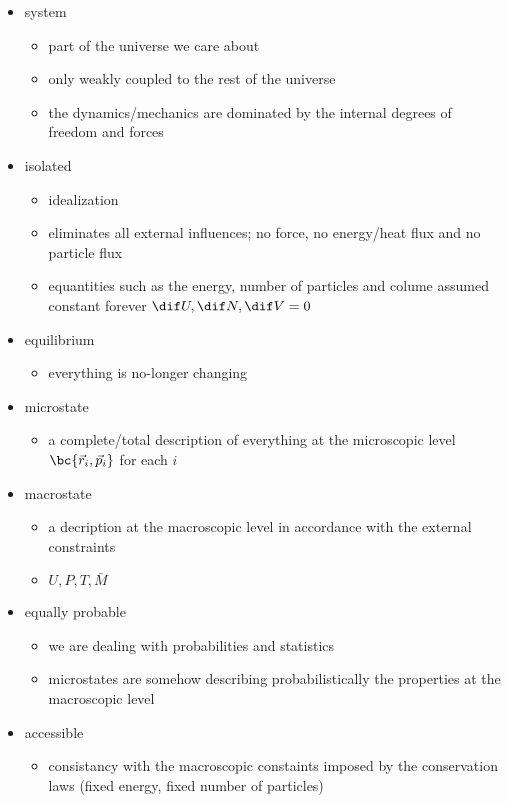\documentclass{article}
\begin{document}
\begin{itemize}
    \item system
    \begin{itemize}
        \item part of the universe we care about
        \item only weakly coupled to the rest of the universe
        \item the dynamics/mechanics are dominated by the internal degrees of freedom and forces
    \end{itemize}
    \item isolated
    \begin{itemize}
        \item idealization
        \item eliminates all external influences; no force, no energy/heat flux and no particle flux
        \item equantities such as the energy, number of particles and colume assumed constant forever $\dif U, \dif N, \dif V = 0$
    \end{itemize}
    \item equilibrium
    \begin{itemize}
        \item everything is no-longer changing
    \end{itemize}
    \item microstate
    \begin{itemize}
        \item a complete/total description of everything at the microscopic level $\bc{\vec{r}_i, \vec{p}_i}$ for each $i$
    \end{itemize}
    \item macrostate
    \begin{itemize}
        \item a decription at the macroscopic level in accordance with the external constraints
        \item $U, P, T, \bar{M}$
    \end{itemize}
    \item equally probable
    \begin{itemize}
        \item we are dealing with probabilities and statistics
        \item microstates are somehow describing probabilistically the properties at the macroscopic level
    \end{itemize}
    \item accessible
    \begin{itemize}
        \item  consistancy with the macroscopic constaints imposed by the conservation laws (fixed energy, fixed number of particles)
    \end{itemize}
\end{itemize}
\end{document}
